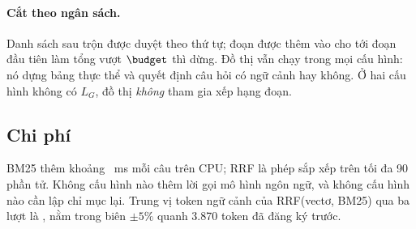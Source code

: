 \paragraph{Cắt theo ngân sách.}
Danh sách sau trộn được duyệt theo thứ tự; đoạn được thêm vào cho tới đoạn đầu tiên làm tổng vượt $\budget$ thì dừng.
Đồ thị vẫn chạy trong mọi cấu hình: nó dựng bảng thực thể và quyết định câu hỏi có ngữ cảnh hay không.
Ở hai cấu hình không có $L_G$, đồ thị \emph{không} tham gia xếp hạng đoạn.

\subsection{Chi phí}
BM25 thêm khoảng \bmMs{}~ms mỗi câu trên CPU; RRF là phép sắp xếp trên tối đa 90 phần tử.
Không cấu hình nào thêm lời gọi mô hình ngôn ngữ, và không cấu hình nào cần lập chỉ mục lại.
Trung vị token ngữ cảnh của RRF(vectơ, BM25) qua ba lượt là \tokVK{}, nằm trong biên $\pm 5\%$ quanh 3.870 token đã đăng ký trước.

